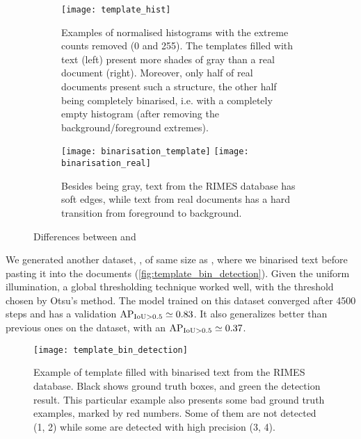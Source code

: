 		\begin{figure}
			\begin{subfigure}{\linewidth}
				\texttt{[image: template\_hist]}
				\caption[Template histograms]{
					Examples of normalised histograms with the extreme counts removed (0 and 255). The templates filled with text (left) present more shades of gray than a real document (right).  Moreover, only half of real documents present such a structure, the other half being completely binarised, i.e. with a completely empty histogram (after removing the background/foreground extremes).
				}
				\label{fig:template_gray_hist}
			\end{subfigure}
			\begin{subfigure}{\linewidth}
				\texttt{[image: binarisation\_template]}
				\texttt{[image: binarisation\_real]}
				\caption{Besides being gray, text from the RIMES database has soft edges, while text from real documents has a hard transition from foreground to background.}
				\label{fig:template_gray_example}
			\end{subfigure}
			\caption{Differences between  and }
			\label{fig:template_gray}
		\end{figure}

		We generated another dataset, , of same size as , where we binarised text before pasting it into the documents (\autoref{fig:template_bin_detection}). Given the uniform illumination, a global thresholding technique worked well, with the threshold chosen by Otsu's method. The model trained on this dataset converged after 4500 steps and has a validation \(\operatorname{\operatorname{AP}_{\operatorname{IoU} > 0.5}} \simeq 0.83 \). It also generalizes better than previous ones on the  dataset, with an \(\operatorname{\operatorname{AP}_{\operatorname{IoU} > 0.5}} \simeq 0.37\).

		\begin{figure}
			\texttt{[image: template\_bin\_detection]}
			\caption[ example]{Example of template filled with binarised text from the RIMES database. Black shows ground truth boxes, and green the detection result. This particular example also presents some bad ground truth examples, marked by red numbers. Some of them are not detected (1, 2) while some are detected with high precision (3, 4). }
			\label{fig:template_bin_detection}
		\end{figure}



